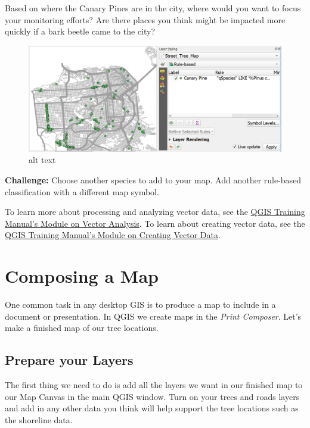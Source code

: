 \documentclass[
]{article}
\begin{document}
Based on where the Canary Pines are in the city, where would you want to focus your monitoring efforts? Are there places you think might be impacted more quickly if a bark beetle came to the city?

\begin{figure}
\centering
\includegraphics{./images/Vector_CanaryPine.PNG}
\caption{alt text}
\end{figure}

\textbf{Challenge:} Choose another species to add to your map. Add another rule-based classification with a different map symbol.

To learn more about processing and analyzing vector data, see the \href{https://docs.qgis.org/2.18/en/docs/training_manual/vector_analysis/index.html}{QGIS Training Manual's Module on Vector Analysis}. To learn about creating vector data, see the \href{https://docs.qgis.org/2.18/en/docs/training_manual/create_vector_data/index.html}{QGIS Training Manual's Module on Creating Vector Data}.

\hypertarget{composing-a-map}{%
\section{Composing a Map}\label{composing-a-map}}

One common task in any desktop GIS is to produce a map to include in a document or presentation. In QGIS we create maps in the \emph{Print Composer}. Let's make a finished map of our tree locations.

\hypertarget{prepare-your-layers}{%
\subsection{Prepare your Layers}\label{prepare-your-layers}}

The first thing we need to do is add all the layers we want in our finished map to our Map Canvas in the main QGIS window. Turn on your trees and roads layers and add in any other data you think will help support the tree locations such as the shoreline data.
\end{document}
